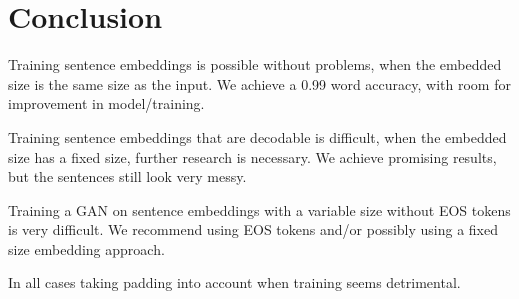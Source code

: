 \documentclass{article}
\begin{document}
\section{Conclusion}\label{sec:conclusion}
Training sentence embeddings is possible without problems,
when the embedded size is the same size as the input.
We achieve a 0.99 word accuracy, with room for improvement in model/training.

Training sentence embeddings that are decodable is difficult, when the embedded
size has a fixed size, further research is necessary.
We achieve promising results, but the sentences still look very messy.

Training a GAN on sentence embeddings with a variable size without
EOS tokens is very difficult. We recommend using EOS tokens and/or possibly
using a fixed size embedding approach.

In all cases taking padding into account when training seems detrimental.

\newpage
\printbibliography%
\end{document}
